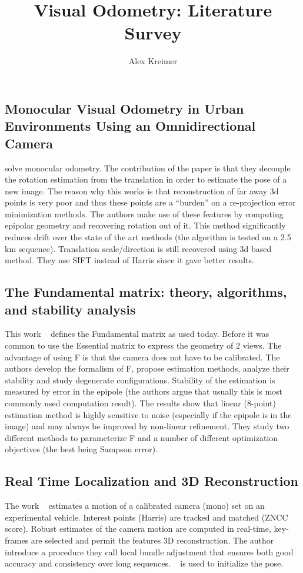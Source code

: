 \documentclass[10pt]{article}         %
\title{Visual Odometry: Literature Survey}
\author{Alex Kreimer}
\begin{document}
\maketitle

\begin{abstract}
\end{abstract}

\subsection{Monocular Visual Odometry in Urban Environments Using an
  Omnidirectional Camera}
\cite{tardif2008monocular} solve monocular odometry.  The contribution
of the paper is that they decouple the rotation estimation from the
translation in order to estimate the pose of a new image.  The reason
why this works is that reconstruction of far away 3d points is very
poor and thus these points are a ``burden'' on a re-projection error
minimization methods.  The authors make use of these features by
computing epipolar geometry and recovering rotation out of it.  This
method significantly reduces drift over the state of the art methods
(the algorithm is tested on a 2.5 km sequence).  Translation
scale/direction is still recovered using 3d based method.  They use
SIFT instead of Harris since it gave better results.

\subsection{The Fundamental matrix: theory, algorithms, and stability
  analysis}
This work ~\cite{luong1996fundamental} defines the Fundamental matrix
as used today.  Before it was common to use the Essential matrix to
express the geometry of 2 views.  The advantage of using F is that the
camera does not have to be calibrated.  The authors develop the
formalism of F, propose estimation methods, analyze their stability
and study degenerate configurations.  Stability of the estimation is
measured by error in the epipole (the authors argue that usually this
is most commonly used computation result).  The results show that
linear (8-point) estimation method is highly sensitive to noise
(especially if the epipole is in the image) and may always be improved
by non-linear refinement.  They study two different methods to
parameterize F and a number of different optimization objectives (the
best being Sampson error).

\subsection{Real Time Localization and 3D Reconstruction}
The work ~\cite{mouragnon2006real} estimates a motion of a calibrated
camera (mono) set on an experimental vehicle.  Interest points (Harris) are
tracked and matched (ZNCC score). Robust estimates of the camera motion are
computed in real-time, key-frames are selected and permit the features
3D reconstruction.  The author introduce a procedure they call local
bundle adjustment that ensures both good accuracy and consistency over
long sequences. ~\cite{nister2004efficient} is used to initialize the pose.
\end{document}
